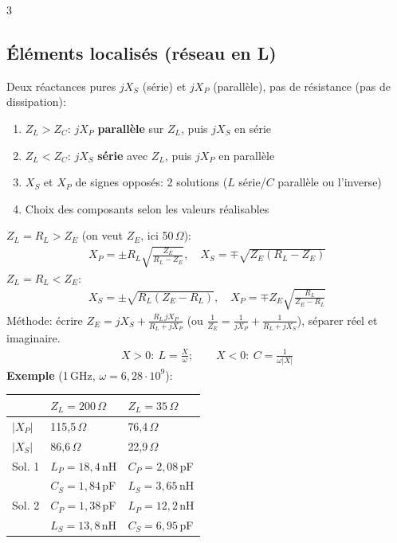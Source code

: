\documentclass[12pt, a4paper]{article}
\begin{document}
\begin{multicols*}{3}
	\subsection{Éléments localisés (réseau en L)}
	Deux réactances pures $jX_S$ (série) et $jX_P$ (parallèle), pas de résistance (pas de dissipation):
	\begin{enumerate}[\roman*.]
		\item $Z_L>Z_C$: $jX_P$ \textbf{parallèle} sur $Z_L$, puis $jX_S$ en série
		\item $Z_L<Z_C$: $jX_S$ \textbf{série} avec $Z_L$, puis $jX_P$ en parallèle
		\item $X_S$ et $X_P$ de signes opposés: 2 solutions ($L$ série/$C$ parallèle ou l'inverse)
		\item Choix des composants selon les valeurs réalisables
	\end{enumerate}
	\textbf{$Z_L=R_L>Z_E$} (on veut $Z_E$, ici 50\,$\Omega$):
	\begin{gather*}
		X_P=\pm R_L\sqrt{\frac{Z_E}{R_L-Z_E}},\quad X_S=\mp\sqrt{Z_E(R_L-Z_E)}
	\end{gather*}
	\textbf{$Z_L=R_L<Z_E$}:
	\begin{gather*}
		X_S=\pm\sqrt{R_L(Z_E-R_L)},\quad X_P=\mp Z_E\sqrt{\frac{R_L}{Z_E-R_L}}
	\end{gather*}
	Méthode: écrire $Z_E=jX_S+\frac{R_L\,jX_P}{R_L+jX_P}$ (ou $\frac1{Z_E}=\frac1{jX_P}+\frac1{R_L+jX_S}$), séparer réel et imaginaire.
	\begin{gather*}
		X>0:\ L=\frac{X}{\omega};\qquad X<0:\ C=\frac{1}{\omega|X|}
	\end{gather*}
	\textbf{Exemple} (1\,GHz, $\omega=6{,}28\cdot10^9$):

	\begin{tabular}{|l|l|l|}
		\hline
		                & $Z_L=200\,\Omega$     & $Z_L=35\,\Omega$     \\
		\hline
		$|X_P|$         & 115,5\,$\Omega$       & 76,4\,$\Omega$       \\
		$|X_S|$         & 86,6\,$\Omega$        & 22,9\,$\Omega$       \\
		\hline
		Sol. 1          & $L_P=18{,}4$\,nH      & $C_P=2{,}08$\,pF     \\
		                & $C_S=1{,}84$\,pF      & $L_S=3{,}65$\,nH     \\
		\hline
		Sol. 2          & $C_P=1{,}38$\,pF      & $L_P=12{,}2$\,nH     \\
		                & $L_S=13{,}8$\,nH      & $C_S=6{,}95$\,pF     \\
		\hline
	\end{tabular}


\end{multicols*}
\end{document}
